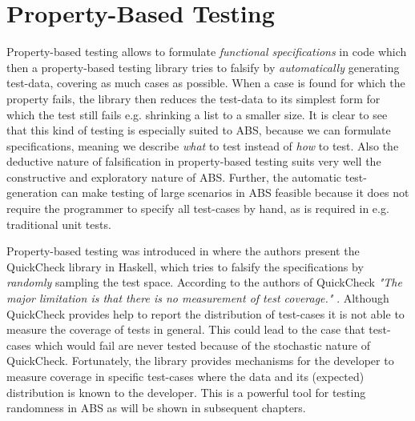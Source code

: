 \section*{Property-Based Testing}
\label{sec:proptesting}

Property-based testing allows to formulate \textit{functional specifications} in code which then a property-based testing library tries to falsify by \textit{automatically} generating test-data, covering as much cases as possible. When a case is found for which the property fails, the library then reduces the test-data to its simplest form for which the test still fails e.g. shrinking a list to a smaller size. It is clear to see that this kind of testing is especially suited to ABS, because we can formulate specifications, meaning we describe \textit{what} to test instead of \textit{how} to test. Also the deductive nature of falsification in property-based testing suits very well the constructive and exploratory nature of ABS. Further, the automatic test-generation can make testing of large scenarios in ABS feasible because it does not require the programmer to specify all test-cases by hand, as is required in e.g. traditional unit tests.

Property-based testing was introduced in \cite{claessen_quickcheck_2000,claessen_testing_2002} where the authors present the QuickCheck library in Haskell, which tries to falsify the specifications by \textit{randomly} sampling the test space. %
According to the authors of QuickCheck \textit{"The major limitation is that there is no measurement of test coverage."} \cite{claessen_quickcheck_2000}. Although QuickCheck provides help to report the distribution of test-cases it is not able to measure the coverage of tests in general. This could lead to the case that test-cases which would fail are never tested because of the stochastic nature of QuickCheck. Fortunately, the library provides mechanisms for the developer to measure coverage in specific test-cases where the data and its (expected) distribution is known to the developer. This is a powerful tool for testing randomness in ABS as will be shown in subsequent chapters.

